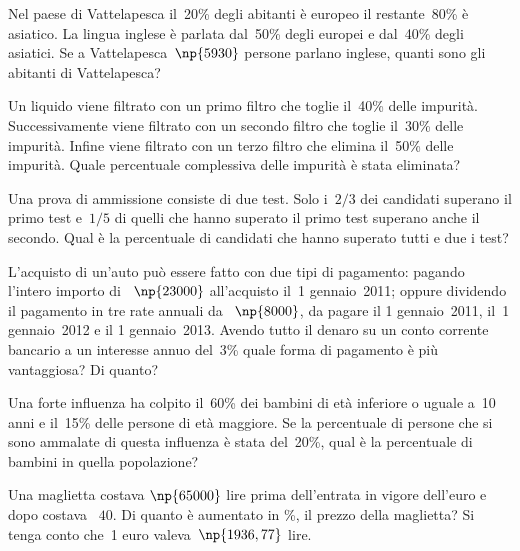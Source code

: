 \begin{multicols}{2}
\begin{esercizio}[\Ast]%
Nel paese di Vattelapesca il~20\% degli abitanti è europeo il
restante~80\% è asiatico. La lingua inglese è parlata dal~50\% degli
europei e dal~40\% degli asiatici. Se a Vattelapesca~$\np{5930}$ persone
parlano inglese, quanti sono gli abitanti di Vattelapesca?
\end{esercizio}

\begin{esercizio}%
Un liquido viene filtrato con un primo filtro che toglie il~40\%
delle impurità. Successivamente viene filtrato con un secondo filtro
che toglie il~30\% delle impurità. Infine viene filtrato con un terzo
filtro che elimina il~50\% delle impurità. Quale percentuale
complessiva delle impurità è stata eliminata?
\end{esercizio}

\begin{esercizio}%
Una prova di ammissione consiste di due test. Solo i~$2/3$ dei
candidati superano il primo test e~$1/5$ di quelli che hanno superato il
primo test superano anche il secondo. Qual è la percentuale di
candidati che hanno superato tutti e due i test?
\end{esercizio}

\begin{esercizio}%
L'acquisto di un'auto può essere fatto con due tipi di pagamento: pagando
l'intero importo di \officialeuro~$\np{23000}$ all'acquisto il~1{\textdegree} gennaio~2011; oppure
dividendo il pagamento in tre rate annuali da \officialeuro~$\np{8000}$, da pagare il
1{\textdegree} gennaio~2011, il~1{\textdegree} gennaio~2012 e il
1{\textdegree} gennaio~2013. Avendo tutto il denaro su un conto
corrente bancario a un interesse annuo del~3\% quale forma di pagamento
è più vantaggiosa? Di quanto?
\end{esercizio}

\begin{esercizio}%
Una forte influenza ha colpito il~60\% dei bambini di età
inferiore o uguale a~10 anni e il~15\% delle persone di età maggiore.
Se la percentuale di persone che si sono ammalate di questa influenza
è stata del~20\%, qual è la percentuale di bambini in quella
popolazione?
\end{esercizio}

\begin{esercizio}[\Ast]%
 Una maglietta costava $\np{65000}$ lire prima
dell'entrata in vigore dell'euro e dopo costava \officialeuro~$40$. Di
quanto è aumentato in \%, il prezzo della maglietta? Si
tenga conto che~1 euro valeva~$\np{1936,77}$ lire.
\end{esercizio}


\end{multicols}
